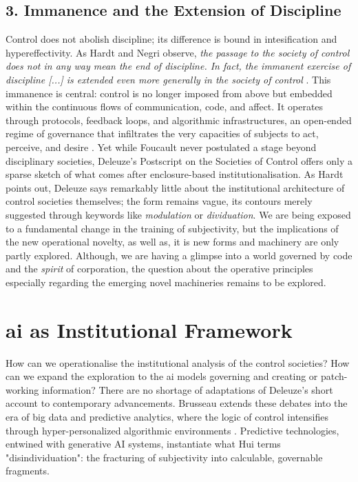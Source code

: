 \subsection{3. Immanence and the Extension of Discipline}
Control does not abolish discipline; its difference is bound in intesification and hypereffectivity. As Hardt and Negri \parencite*{hardt2003}  observe, \textit{the passage to the society of control does not in any way mean the end of discipline. In fact, the immanent exercise of discipline [...] is extended even more generally in the society of control} \parencite[83]{galloway2001}. This immanence is central: control is no longer imposed from above but embedded within the continuous flows of communication, code, and affect. It operates through protocols, feedback loops, and algorithmic infrastructures, an open-ended regime of governance that infiltrates the very capacities of subjects to act, perceive, and desire
. Yet while Foucault never postulated a stage beyond disciplinary societies, Deleuze’s Postscript on the Societies of Control offers only a sparse sketch of what comes after enclosure-based institutionalisation. As Hardt \parencite*[139]{hardt1998}  points out, Deleuze says remarkably little about the institutional architecture of control societies themselves; the form remains vague, its contours merely suggested through keywords like \textit{modulation} or \textit{dividuation}. We are being exposed to a fundamental change in the training of subjectivity, but the implications of the new operational novelty, as well as, it is new forms and machinery are only partly explored. Although, we are having a glimpse into a world governed by code and the \textit{spirit} of corporation, the question about the operative principles especially regarding the emerging novel machineries remains to be explored.




\section{\Gls{ai} as Institutional Framework}
How can we operationalise the institutional analysis of the control societies? How can we expand the exploration to the \gls{ai} models governing and creating or patch-working information? There are no shortage of adaptations of Deleuze's short account to contemporary advancements. Brusseau extends these debates into the era of big data and predictive analytics, where the logic of control intensifies through hyper-personalized algorithmic environments \parencite{brusseau2020}. Predictive technologies, entwined with generative AI systems, instantiate what Hui terms "disindividuation": the fracturing of subjectivity into calculable, governable fragments.

